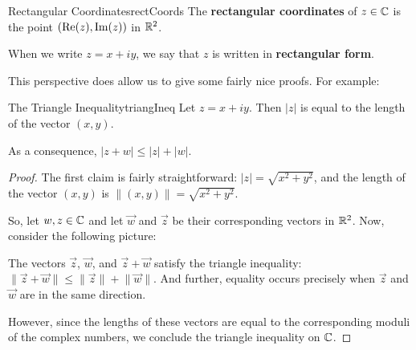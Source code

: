 \begin{defbo}{Rectangular Coordinates}{rectCoords}  The {\bf rectangular coordinates} of $z \in \mathbb{C}$ is the point $(\operatorname{Re}(z), \operatorname{Im}(z))$ in $\mathbb{R}^2$.

When we write $z = x + iy$, we say that $z$ is written in {\bf rectangular form}.
\end{defbo}


This perspective does allow us to give some fairly nice proofs. For example:

\begin{thmbo}{The Triangle Inequality}{triangIneq}
 Let $z = x+iy$. Then $|z|$ is equal to the length of the vector $(x,y)$.

\vspace{5pt}

As a consequence, $|z + w| \le |z| + |w|$.
\end{thmbo}

\begin{proof} The first claim is fairly straightforward: $|z| = \sqrt{x^2 + y^2}$, and the length of the vector $(x,y)$ is $\lVert (x,y) \rVert = \sqrt{x^2 + y^2}$.

So, let $w,z\in \mathbb{C}$ and let $\vec{w}$ and $\vec{z}$ be their corresponding vectors in $\mathbb{R}^2$. Now, consider the following picture:

\begin{center}
\end{center}

The vectors $\vec{z}$,  $\vec{w}$, and $\vec{z} + \vec{w}$ satisfy the triangle inequality: $\lVert \vec{z} + \vec{w} \rVert \le \lVert\vec{z}\rVert + \lVert\vec{w}\rVert$. And further, equality occurs precisely when $\vec{z}$ and $\vec{w}$ are in the same direction.

However, since the lengths of these vectors are equal to the corresponding moduli of the complex numbers, we conclude the triangle inequality on $\mathbb{C}$.

\end{proof}


